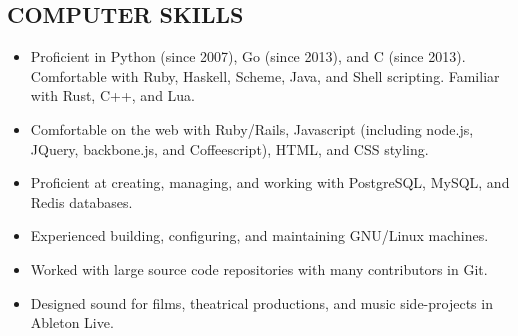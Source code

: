 \documentclass{res}     %
\begin{document}
\begin{resume}

\section{COMPUTER SKILLS}
\vspace{5mm}
\begin{itemize}[leftmargin=5mm]
\item Proficient in Python (since 2007), Go (since 2013), and C (since 2013). Comfortable with Ruby, Haskell, Scheme, Java, and Shell scripting. Familiar with Rust, C++, and Lua.
\item Comfortable on the web with Ruby/Rails, Javascript (including node.js, JQuery, backbone.js, and Coffeescript), HTML, and CSS styling.
\item Proficient at creating, managing, and working with PostgreSQL, MySQL, and Redis databases.
\item Experienced building, configuring, and maintaining GNU/Linux machines.
\item Worked with large source code repositories with many contributors in Git.
\item Designed sound for films, theatrical productions, and music side-projects in Ableton Live.
\end{itemize}
 

\end{resume}
\end{document}

